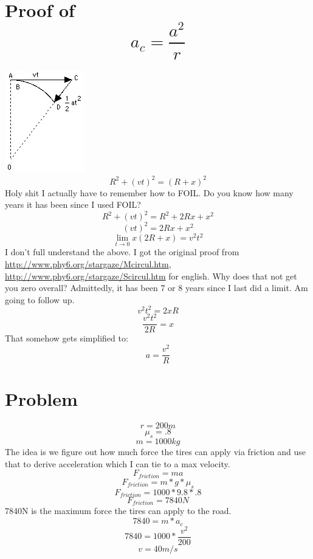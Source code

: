 \documentclass{article}
\begin{document}
\section{Proof of \[a_c=\frac{a^2}{r} \]}
\includegraphics[width=\columnwidth]{triangle}
\[ R^2+(vt)^2=(R+x)^2 \]
Holy shit I actually have to remember how to FOIL. Do you know how many years it has been since I used FOIL?
\[ R^2+(vt)^2=R^2+2Rx+x^2 \]
\[ (vt)^2=2Rx+x^2 \]
\[ \lim_{t\to0} x(2R+x)=v^2t^2 \]
I don't full understand the above. I got the original proof from \url{http://www.phy6.org/stargaze/Mcircul.htm}, \url{http://www.phy6.org/stargaze/Scircul.htm} for english. Why does that not get you zero overall? Admittedly, it has been 7 or 8 years since I last did a limit. Am going to follow up.
\[ v^2t^2=2xR \]
\[ \frac{v^2t^2}{2R}=x \]
That somehow gets simplified to:
\[ a=\frac{v^2}{R} \]
\section{Problem}
\[ r=200m \]
\[ \mu_s=.8 \]
\[ m=1000kg \]
The idea is we figure out how much force the tires can apply via friction and use that to derive acceleration which I can tie to a max velocity.
\[ F_{friction}=ma \]
\[F_{friction}=m*g*\mu_s \]
\[ F_{friction}=1000*9.8*.8 \]
\[ F_{friction}=7840N \]
7840N is the maximum force the tires can apply to the road.
\[ 7840 = m*a_c \]
\[ 7840 = 1000*\frac{v^2}{200} \]
\[ v = 40 m/s \]
\end{document}
